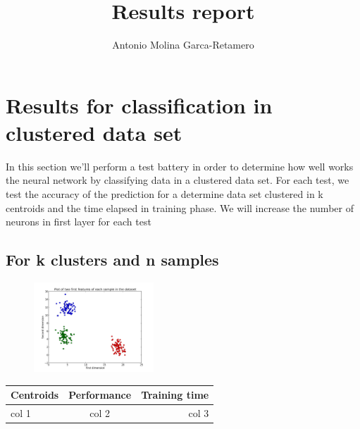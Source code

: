 \documentclass[10pt,a4paper, twocolumn]{report}
\author{Antonio Molina Garca-Retamero}
\title{Results report}
\begin{document}
\maketitle
\pagebreak
\tableofcontents
\pagebreak
\section{Results for classification in clustered data set}
In this section we'll perform a test battery in order to determine how well works the neural network by classifying data in a clustered data set.
For each test, we test the accuracy of the prediction for a determine data set clustered in k centroids and the time elapsed in training phase. We will increase the number of neurons in first layer for each test
\subsection{For k clusters and n samples}
\begin{figure}[!h]{}
    \centering
    \includegraphics[width=0.4\textwidth]{plots/3c100s.png}
    \label{fig:clusteredData1}
\end{figure}
\begin{tabular}{|l | c | r|}
\hline
\hline
Centroids & Performance & Training time \\
\hline
col 1 & col 2 & col 3\\
\hline
\end{tabular}
\end{document}
